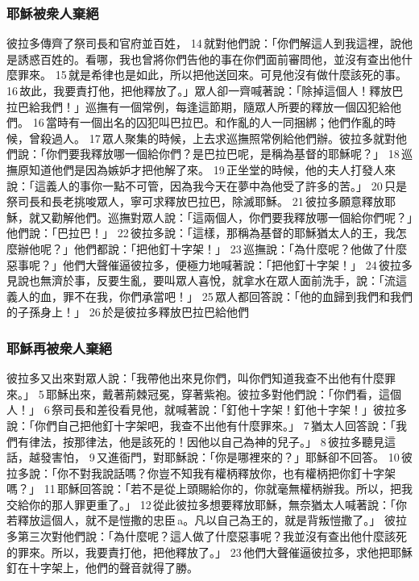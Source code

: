 \subsubsection{耶穌被衆人棄絕}
彼拉多傳齊了祭司長和官府並百姓， 14 就對他們說：「你們解這人到我這裡，說他是誘惑百姓的。看哪，我也曾將你們告他的事在你們面前審問他，並沒有查出他什麼罪來。 15 就是希律也是如此，所以把他送回來。可見他沒有做什麼該死的事。 16 故此，我要責打他，把他釋放了。」眾人卻一齊喊著說：「除掉這個人！釋放巴拉巴給我們！」巡撫有一個常例，每逢這節期，隨眾人所要的釋放一個囚犯給他們。 16 當時有一個出名的囚犯叫巴拉巴。和作亂的人一同捆綁；他們作亂的時候，曾殺過人。 17 眾人聚集的時候，上去求巡撫照常例給他們辦。彼拉多就對他們說：「你們要我釋放哪一個給你們？是巴拉巴呢，是稱為基督的耶穌呢？」 18 巡撫原知道他們是因為嫉妒才把他解了來。 19 正坐堂的時候，他的夫人打發人來說：「這義人的事你一點不可管，因為我今天在夢中為他受了許多的苦。」 20 只是祭司長和長老挑唆眾人，寧可求釋放巴拉巴，除滅耶穌。 21 彼拉多願意釋放耶穌，就又勸解他們。巡撫對眾人說：「這兩個人，你們要我釋放哪一個給你們呢？」他們說：「巴拉巴！」 22 彼拉多說：「這樣，那稱為基督的耶穌猶太人的王，我怎麼辦他呢？」他們都說：「把他釘十字架！」 23 巡撫說：「為什麼呢？他做了什麼惡事呢？」他們大聲催逼彼拉多，便極力地喊著說：「把他釘十字架！」 24 彼拉多見說也無濟於事，反要生亂，要叫眾人喜悅，就拿水在眾人面前洗手，說：「流這義人的血，罪不在我，你們承當吧！」 25 眾人都回答說：「他的血歸到我們和我們的子孫身上！」 26 於是彼拉多釋放巴拉巴給他們

\subsubsection{耶穌再被衆人棄絕}
彼拉多又出來對眾人說：「我帶他出來見你們，叫你們知道我查不出他有什麼罪來。」 5 耶穌出來，戴著荊棘冠冕，穿著紫袍。彼拉多對他們說：「你們看，這個人！」 6 祭司長和差役看見他，就喊著說：「釘他十字架！釘他十字架！」彼拉多說：「你們自己把他釘十字架吧，我查不出他有什麼罪來。」 7 猶太人回答說：「我們有律法，按那律法，他是該死的！因他以自己為神的兒子。」 8 彼拉多聽見這話，越發害怕， 9 又進衙門，對耶穌說：「你是哪裡來的？」耶穌卻不回答。 10 彼拉多說：「你不對我說話嗎？你豈不知我有權柄釋放你，也有權柄把你釘十字架嗎？」 11 耶穌回答說：「若不是從上頭賜給你的，你就毫無權柄辦我。所以，把我交給你的那人罪更重了。」 12 從此彼拉多想要釋放耶穌，無奈猶太人喊著說：「你若釋放這個人，就不是愷撒的忠臣 a。凡以自己為王的，就是背叛愷撒了。」 彼拉多第三次對他們說：「為什麼呢？這人做了什麼惡事呢？我並沒有查出他什麼該死的罪來。所以，我要責打他，把他釋放了。」 23 他們大聲催逼彼拉多，求他把耶穌釘在十字架上，他們的聲音就得了勝。


